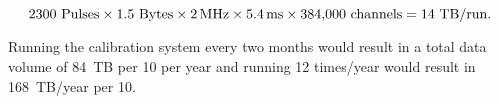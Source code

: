 \begin{equation}
\num{2300}~{\rm Pulses} \times \num{1.5}~{\rm Bytes}\times
\SI{2}{\mega\hertz}\times \SI{5.4}{\milli\s}\times \num{384000}~{\rm channels} = \num{14}~{\rm TB/run}.
\end{equation}

Running the  calibration system every two months would result in a total data volume of \num{84}~TB per \SI{10}{\kt} per year and running \num{12} times/year would result in \num{168}~TB/year per \SI{10}{\kt}. 







